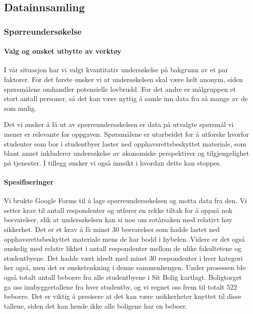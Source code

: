 \subsection{Datainnsamling}

\subsubsection{Spørreundersøkelse}

\paragraph{Valg og ønsket utbytte av verktøy}
I vår situasjon har vi valgt kvantitativ undersøkelse på bakgrunn av et par faktorer. For det første ønsker vi at undersøkelsen skal være helt anonym, siden spørsmålene omhandler potensielle lovbrudd. For det andre er målgruppen et stort antall personer, så det kan være nyttig å samle inn data fra så mange av de som mulig. 

Det vi ønsker å få ut av spørreundersøkelsen er data på utvalgte spørsmål vi mener er relevante for oppgaven. Spørsmålene er utarbeidet for å utforske hvorfor studenter som bor i studentbyer laster ned opphavsrettsbeskyttet materiale, som blant annet inkluderer undersøkelse av økonomiske perspektiver og tilgjengelighet på tjenester. I tillegg ønsker vi også innsikt i hvordan dette kan stoppes.

\paragraph{Spesifiseringer}
Vi brukte Google Forms til å lage spørreundersøkelsen og motta data fra den. Vi setter krav til antall respondenter og utfører en rekke tiltak for å oppnå nok besvarelser, slik at undersøkelsen kan si noe om rotårsaken med relativt høy sikkerhet. Det er et krav å få minst 30 besvarelser som hadde lastet ned opphavsrettsbeskyttet materiale mens de har bodd i hybelen. Videre er det også ønskelig med relativ likhet i antall respondenter mellom de ulike fakultetene og studentbyene. Det hadde vært ideelt med minst 30 respondenter i hver kategori her også, men det er ønsketenkning i denne sammenhengen. Under prosessen ble også totalt antall beboere fra alle studentbyene i Sit Bolig kartlagt. Boligtorget ga oss innbyggertallene fra hver studentby, og vi regnet oss frem til totalt 522 beboere. Det er viktig å presisere at det kan være usikkerheter knyttet til disse tallene, siden det kan hende ikke alle boligene har en beboer.

